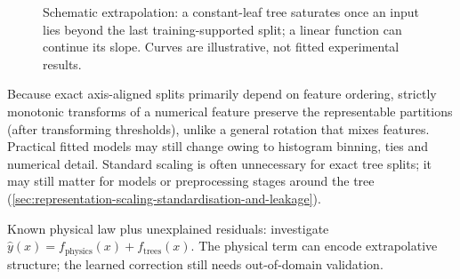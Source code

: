 \begin{figure}[htbp]\centering
{}
\caption{Schematic extrapolation: a constant-leaf tree saturates once an input lies beyond the last training-supported split; a linear function can continue its slope.
Curves are illustrative, not fitted experimental results.}
\label{fig:tree_extrapolation}
\end{figure}

Because exact axis-aligned splits primarily depend on feature ordering, strictly monotonic transforms of a numerical feature preserve the representable partitions (after transforming thresholds), unlike a general rotation that mixes features.
Practical fitted models may still change owing to histogram binning, ties and numerical detail.
Standard scaling is often unnecessary for exact tree splits; it may still matter for models or preprocessing stages around the tree (\cref{sec:representation-scaling-standardisation-and-leakage}).

\begin{calloutpractical}
Known physical law plus unexplained residuals: investigate $\hat y(x)=f_{\mathrm{physics}}(x)+f_{\mathrm{trees}}(x)$.
The physical term can encode extrapolative structure; the learned correction still needs out-of-domain validation.
\end{calloutpractical}

